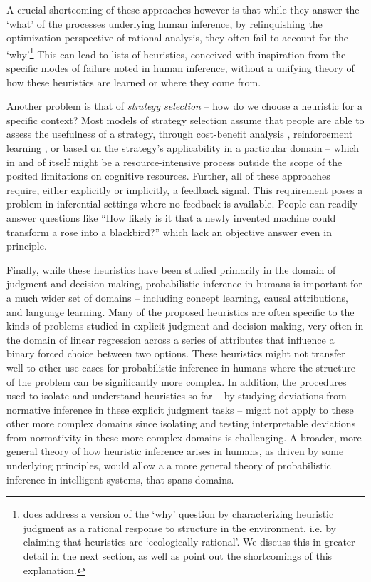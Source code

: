 A crucial shortcoming of these approaches however is that while they answer the `what' of the processes underlying human inference, by relinquishing the optimization perspective of rational analysis, they often fail to account for the `why'\footnote{\citet{gigerenzer2008heuristics} does address a version of the `why' question by characterizing heuristic judgment as a rational response to structure in the environment. i.e. by claiming that heuristics are `ecologically rational'. We discuss this in greater detail in the next section, as well as point out the shortcomings of this explanation.} This can lead to lists of heuristics, conceived with inspiration from the specific modes of failure noted in human inference, without a unifying theory of how these heuristics are learned or where they come from. 

Another problem is that of \emph{strategy selection} \citep{gigerenzer2008heuristics, marewski2014strategy} -- how do we choose a heuristic for a specific context? Most models of strategy selection assume that people are able to assess the usefulness of a strategy, through cost-benefit analysis \citep{johnson85, beach1978contingency, lieder2017strategy}, reinforcement learning \citep{erev05, rieskamp06}, or based on the strategy's applicability in a particular domain \citep{marewski2011cognitive, schulz2016simple} -- which in and of itself might be a resource-intensive process outside the scope of the posited limitations on cognitive resources. Further, all of these approaches require, either explicitly or implicitly, a feedback signal. This requirement poses a problem in inferential settings where no feedback is available. People can readily answer questions like ``How likely is it that a newly invented machine could transform a rose into a blackbird?'' \citep{Griffiths15} which lack an objective answer even in principle. 

Finally, while these heuristics have been studied primarily in the domain of judgment and decision making, probabilistic inference in humans is important for a much wider set of domains -- including concept learning, causal attributions, and language learning. Many of the proposed heuristics are often specific to the kinds of problems studied in explicit judgment and decision making, very often in the domain of linear regression across a series of attributes that influence a binary forced choice between two options. These heuristics might not transfer well to other use cases for probabilistic inference in humans where the structure of the problem can be significantly more complex. In addition, the procedures used to isolate and understand heuristics so far -- by studying deviations from normative inference in these explicit judgment tasks -- might not apply to these other more complex domains since isolating and testing interpretable deviations from normativity in these more complex domains is challenging. A broader, more general theory of how heuristic inference arises in humans, as driven by some underlying principles, would allow a a more general theory of probabilistic inference in intelligent systems, that spans domains.

